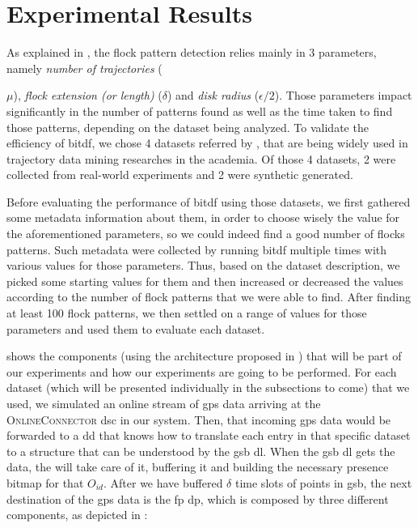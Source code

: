 \chapter{Experimental Results}
\label{chp:results}
As explained in , the flock pattern detection relies mainly in 3 parameters, namely
\textit{number of trajectories} ({$\mu$), \textit{flock extension (or length)} ($\delta$) and \textit{disk radius}
($\epsilon/2$). Those parameters impact significantly in the number of patterns found as well as the time taken to find
those patterns, depending on the dataset being analyzed. To validate the efficiency of \ac{bitdf}, we chose 4 datasets
referred by , that are being widely used in trajectory data mining researches in the academia. Of
those 4 datasets, 2 were collected from real-world experiments and 2 were synthetic generated.

Before evaluating the performance of \ac{bitdf} using those datasets, we first gathered some metadata information about
them, in order to choose wisely the value for the aforementioned parameters, so we could indeed find a good number of
flocks patterns. Such metadata were collected by running \ac{bitdf} multiple times with various values for those
parameters. Thus, based on the dataset description, we picked some starting values for them and then increased or
decreased the values according to the number of flock patterns that we were able to find. After finding at least 100
flock patterns, we then settled on a range of values for those parameters and used them to evaluate each dataset.

 shows the components (using the architecture proposed in ) that
will be part of our experiments and how our experiments are going to be performed. For each dataset (which will be
presented individually in the subsections to come) that we used, we simulated an online stream of \ac{gps} data arriving
at the \textsc{OnlineConnector} \ac{dsc} in our system. Then, that incoming \ac{gps} data would be forwarded to a
\ac{dd} that knows how to translate each entry in that specific dataset to a structure that can be understood by the
\ac{gsb} \ac{dl}. When the \ac{gsb} \ac{dl} gets the data, the  will take care of it, buffering it and
building the necessary presence bitmap for that $O_{id}$. After we have buffered $\delta$ time slots of points in
\ac{gsb}, the next destination of the \ac{gps} data is the \ac{fp} \ac{dp}, which is composed by three different
components, as depicted in :

}
